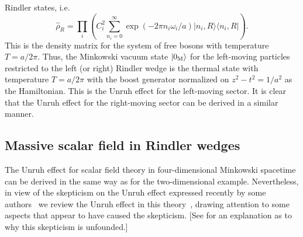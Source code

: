 \documentclass[12pt,nofootinbib,floatfix,aps,prd,showpacs,amsmath,amssymb,eqsecnum]{revtex4-2}
\let\cite\citep
\begin{document}
Rindler states, i.e.
\begin{equation}
\hat{\rho}_R =  \prod_i \left( C_i^2 \sum_{n_{i}=0}^\infty \exp(-2\pi
n_{i}\omega_i/a)|n_{i},R\rangle\langle n_{i},R|
\right). \label{sec2:discdensity}
\end{equation}
This is the density matrix for the system of free bosons with
temperature $T = a/2\pi$.  Thus, the Minkowski vacuum state $|0_{\rm
M}\rangle$ for the
left-moving particles restricted to the left (or right) Rindler wedge is
the thermal state with temperature $T=a/2\pi$ with the boost
generator normalized on $z^2-t^2=1/a^2$ as the Hamiltonian. This is the
Unruh effect for the left-moving sector.  It is clear
that the Unruh effect for the right-moving sector can be derived
in a similar manner.

\subsection{Massive scalar field in Rindler wedges}
\label{section2:massive}

The Unruh effect for scalar field theory in four-dimensional Minkowski
spacetime can be derived in the same way as for the
two-dimensional example.  Nevertheless, in view of the skepticism on
the Unruh effect expressed recently by some 
authors~\cite{Belinskiietal97,Fedotovetal99,Belinskiietal02,Belinskiietal04,Oriti00}
 we review the Unruh effect in this theory~\cite{Fulling73,Unruh76}, drawing attention to
some aspects that appear to have caused the skepticism. [See
\textcite{rebuttal} for an explanation as to why this skepticism is
unfounded.]
\end{document}
